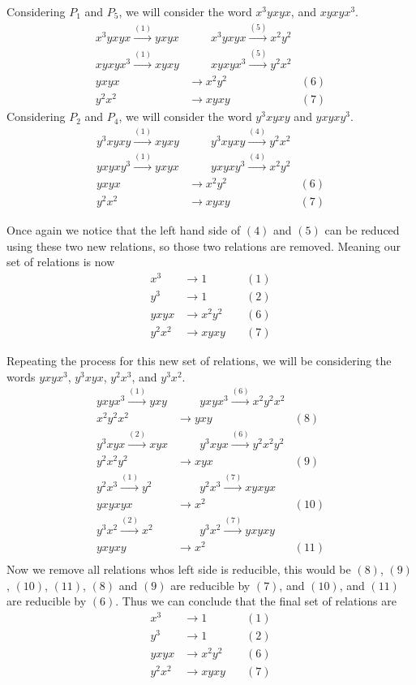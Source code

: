 \documentclass[10pt]{amsart}
\theoremstyle{definition}
\begin{document}
Considering $P_1$ and $P_5$, we will consider the word $x^3yxyx$, and $xyxyx^3$.
\begin{align*}
  x^3yxyx\xrightarrow{(1)}yxyx&\quad\quad
  x^3yxyx\xrightarrow{(5)}x^2y^2\\
  xyxyx^3\xrightarrow{(1)}xyxy&\quad\quad
  xyxyx^3\xrightarrow{(5)}y^2x^2\\
  yxyx&\rightarrow x^2y^2\quad&(6)\\
  y^2x^2&\rightarrow xyxy\quad&(7)
\end{align*}
Considering $P_2$ and $P_4$, we will consider the word $y^3xyxy$ and $yxyxy^3$.
\begin{align*}
  y^3xyxy\xrightarrow{(1)}xyxy&\quad\quad
  y^3xyxy\xrightarrow{(4)}y^2x^2\\
  yxyxy^3\xrightarrow{(1)}yxyx&\quad\quad
  yxyxy^3\xrightarrow{(4)}x^2y^2\\
  yxyx&\rightarrow x^2y^2\quad&(6)\\
  y^2x^2&\rightarrow xyxy\quad&(7)
\end{align*}

Once again we notice that the left hand side of $(4)$ and $(5)$ can be reduced
using these two new relations, so those two relations are removed. Meaning our
set of relations is now
\begin{align*}
  x^3&\rightarrow1\quad&(1)\\
  y^3&\rightarrow1\quad&(2)\\
  yxyx&\rightarrow x^2y^2\quad&(6)\\
  y^2x^2&\rightarrow xyxy\quad&(7)
\end{align*}

Repeating the process for this new set of relations, we will be considering the
words $yxyx^3$, $y^3xyx$, $y^2x^3$, and $y^3x^2$.
\begin{align*}
  yxyx^3\xrightarrow{(1)}yxy&\quad\quad
  yxyx^3\xrightarrow{(6)}x^2y^2x^2\\
  x^2y^2x^2&\rightarrow yxy\quad&(8)\\
  y^3xyx\xrightarrow{(2)}xyx&\quad\quad
  y^3xyx\xrightarrow{(6)}y^2x^2y^2\\
  y^2x^2y^2&\rightarrow xyx\quad&(9)\\
  y^2x^3\xrightarrow{(1)}y^2&\quad\quad
  y^2x^3\xrightarrow{(7)} xyxyx\\
  yxyxyx&\rightarrow x^2\quad&(10)\\
  y^3x^2\xrightarrow{(2)}x^2&\quad\quad
  y^3x^2\xrightarrow{(7)}yxyxy\\
  yxyxy&\rightarrow x^2\quad&(11)\\
\end{align*}
Now we remove all relations whos left side is reducible, this would be $(8)$,
$(9)$, $(10)$, $(11)$, $(8)$ and $(9)$ are reducible by $(7)$, and $(10)$, and
$(11)$ are reducible by $(6)$. Thus we can conclude that the final set of
relations are
\begin{align*}
  x^3&\rightarrow1\quad&(1)\\
  y^3&\rightarrow1\quad&(2)\\
  yxyx&\rightarrow x^2y^2\quad&(6)\\
  y^2x^2&\rightarrow xyxy\quad&(7)
\end{align*}
\end{document}
